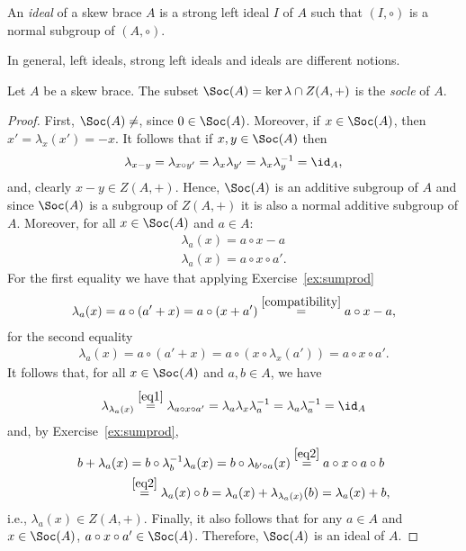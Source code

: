     \begin{definition}
        An \emph{ideal} of a skew brace $A$ is a strong left ideal $I$ of $A$ such that    $(I,\circ)$ is a normal subgroup of $(A,\circ)$.
    \end{definition}

    In general, left ideals, strong left ideals and ideals are different notions.
    
    \begin{definition}
        Let $A$ be a skew brace. The subset $\Soc(A) = \ker \lambda \cap Z(A, +)$ is the
        \emph{socle} of $A$.
    \end{definition}

    \begin{proof}
        First, $\Soc(A) \neq \empty$, since $0\in \Soc(A)$. Moreover, if $x\in \Soc(A)$, then $x'=\lambda_x(x') = - x$.
        It follows that if $x,y\in \Soc(A)$ then 
        \begin{align*}
            \lambda_{x-y}=\lambda_{x\circ y'} = \lambda_x\lambda_{y'} =\lambda_x\lambda^{-1}_y =\id_A,
        \end{align*}
        and, clearly $x-y\in Z(A,+)$. Hence, $\Soc(A)$ is an additive subgroup of $A$ and since $\Soc(A)$ is a subgroup of $Z(A,+)$ it is also a normal additive subgroup of $A$. 
        Moreover,
        for all $x\in \Soc(A)$ and $a \in A$: 
        \begin{align}
            \label{eq1}\lambda_a(x)=a\circ x - a\\
            \label{eq2}\lambda_a(x)=a\circ x\circ a'.
        \end{align}
        For the first equality we have that applying Exercise~\ref{ex:sumprod}
        \begin{align*}
            \lambda_a(x)= a\circ (a'+x) = a\circ(x+a') \overset{\eqref{compatibility}}{=} a\circ x - a,
        \end{align*}
        for the second equality
        \begin{align*}
            \lambda_a(x)=a\circ (a'+x) =a\circ(x\circ\lambda_x(a')) = a\circ x \circ a'.
        \end{align*}
        It follows that, for all $x\in \Soc(A)$ and $a,b\in A$, we have
        \begin{align*}
            \lambda_{\lambda_a(x)} \overset{\eqref{eq1}}{=} \lambda_{a\circ x \circ a'} = \lambda_a\lambda_x\lambda_a^{-1} = \lambda_a\lambda_a^{-1}=\id_A
        \end{align*}
        and, by Exercise~\ref{ex:sumprod},
        \begin{align*}
            b+\lambda_a(x) &= b\circ\lambda^{-1}_{b}\lambda_a(x) = b \circ\lambda_{b'\circ a}(x) \overset{\eqref{eq2}}{=} a \circ x \circ a \circ b \\&\overset{\eqref{eq2}}{=} \lambda_a(x)\circ b = \lambda_a(x) + \lambda_{\lambda_a(x)}(b) = \lambda_a(x) +b,
        \end{align*}
        i.e., $\lambda_a(x)\in Z(A,+)$. Finally, it also follows that for any $a\in A$ and $x\in \Soc(A)$, $a\circ x\circ a'\in \Soc(A)$. Therefore, $\Soc(A)$ is an ideal of $A$.
    \end{proof}

